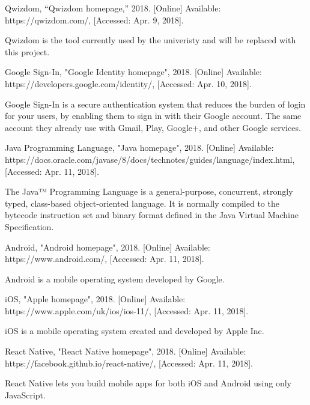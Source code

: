 \documentclass[11pt,a4paper]{report}
\begin{document}

\begin{thebibliography}{1}

 Qwizdom, “Qwizdom homepage,” 2018. [Online] Available: https://qwizdom.com/, [Accessed: Apr. 9, 2018].

  Qwizdom is the tool currently used by the univeristy and will be replaced with this project.

 Google Sign-In, "Google Identity homepage", 2018. [Online] Available: https://developers.google.com/identity/, [Accessed: Apr. 10, 2018].

  Google Sign-In is a secure authentication system that reduces the burden of login for your users, by enabling them
  to sign in with their Google account. The same account they already use with Gmail, Play, Google+, and other Google services.

 Java Programming Language, "Java homepage", 2018. [Online] Available:
  https://docs.oracle.com/javase/8/docs/technotes/guides/language/index.html, [Accessed: Apr. 11, 2018].

  The Java™ Programming Language is a general-purpose, concurrent, strongly typed, class-based object-oriented language.
  It is normally compiled to the bytecode instruction set and binary format defined in the Java Virtual Machine Specification.

 Android, "Android homepage", 2018. [Online] Available: https://www.android.com/, [Accessed: Apr. 11, 2018].

  Android is a mobile operating system developed by Google.

 iOS, "Apple homepage", 2018. [Online] Available: https://www.apple.com/uk/ios/ios-11/, [Accessed: Apr. 11, 2018].

  iOS is a mobile operating system created and developed by Apple Inc.

 React Native, "React Native homepage", 2018. [Online] Available: https://facebook.github.io/react-native/, [Accessed: Apr. 11, 2018].

  React Native lets you build mobile apps for both iOS and Android using only JavaScript.


\end{thebibliography}
\end{document}
